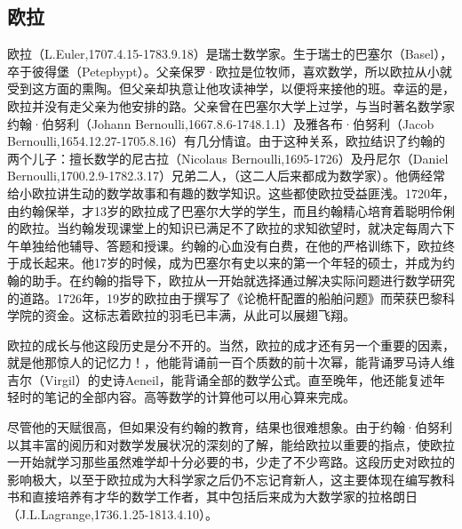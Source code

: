 \documentclass[UTF8]{ctexbook}
\begin{document}
\subsection{欧拉}

欧拉（L.Euler,1707.4.15-1783.9.18）是瑞士数学家。生于瑞士的巴塞尔（Basel），卒于彼得堡（Petepbypt）。父亲保罗·欧拉是位牧师，喜欢数学，所以欧拉从小就受到这方面的熏陶。但父亲却执意让他攻读神学，以便将来接他的班。幸运的是，欧拉并没有走父亲为他安排的路。父亲曾在巴塞尔大学上过学，与当时著名数学家约翰·伯努利（Johann Bernoulli,1667.8.6-1748.1.1）及雅各布·伯努利（Jacob Bernoulli,1654.12.27-1705.8.16）有几分情谊。由于这种关系，欧拉结识了约翰的两个儿子：擅长数学的尼古拉（Nicolaus Bernoulli,1695-1726）及丹尼尔（Daniel Bernoulli,1700.2.9-1782.3.17）兄弟二人，（这二人后来都成为数学家）。他俩经常给小欧拉讲生动的数学故事和有趣的数学知识。这些都使欧拉受益匪浅。1720年，由约翰保举，才13岁的欧拉成了巴塞尔大学的学生，而且约翰精心培育着聪明伶俐的欧拉。当约翰发现课堂上的知识已满足不了欧拉的求知欲望时，就决定每周六下午单独给他辅导、答题和授课。约翰的心血没有白费，在他的严格训练下，欧拉终于成长起来。他17岁的时候，成为巴塞尔有史以来的第一个年轻的硕士，并成为约翰的助手。在约翰的指导下，欧拉从一开始就选择通过解决实际问题进行数学研究的道路。1726年，19岁的欧拉由于撰写了《论桅杆配置的船舶问题》而荣获巴黎科学院的资金。这标志着欧拉的羽毛已丰满，从此可以展翅飞翔。

欧拉的成长与他这段历史是分不开的。当然，欧拉的成才还有另一个重要的因素，就是他那惊人的记忆力！，他能背诵前一百个质数的前十次幂，能背诵罗马诗人维吉尔（Virgil）的史诗Aeneil，能背诵全部的数学公式。直至晚年，他还能复述年轻时的笔记的全部内容。高等数学的计算他可以用心算来完成。

尽管他的天赋很高，但如果没有约翰的教育，结果也很难想象。由于约翰·伯努利以其丰富的阅历和对数学发展状况的深刻的了解，能给欧拉以重要的指点，使欧拉一开始就学习那些虽然难学却十分必要的书，少走了不少弯路。这段历史对欧拉的影响极大，以至于欧拉成为大科学家之后仍不忘记育新人，这主要体现在编写教科书和直接培养有才华的数学工作者，其中包括后来成为大数学家的拉格朗日（J.L.Lagrange,1736.1.25-1813.4.10）。
\end{document}
